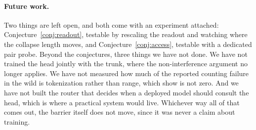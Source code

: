 \documentclass[10pt]{article}
\theoremstyle{definition}
\begin{document}
\paragraph{Future work.} Two things are left open, and both come with an
experiment attached: Conjecture~\ref{conj:readout}, testable by rescaling
the readout and watching where the collapse length moves, and
Conjecture~\ref{conj:access}, testable with a dedicated pair probe. Beyond
the conjectures, three things we have not done. We have not trained the
head jointly with the trunk, where the non-interference argument no longer
applies. We have not measured how much of the reported counting failure in
the wild is tokenization rather than range, which
\citet{zhang2024tokenization} show is not zero. And we have not built the
router that decides when a deployed model should consult the head, which is
where a practical system would live. Whichever way all of that comes out,
the barrier itself does not move, since it was never a claim about
training.
\end{document}
